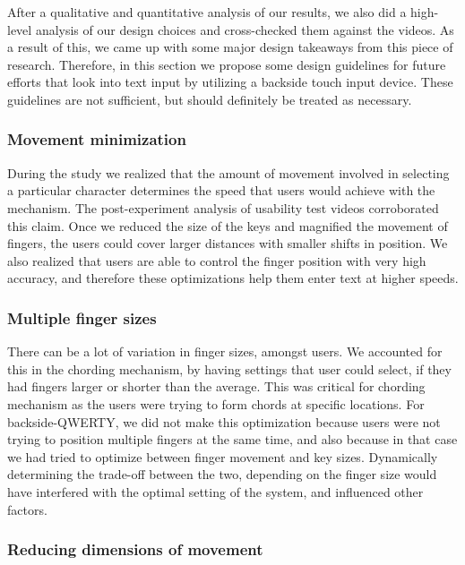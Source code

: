After a qualitative and quantitative analysis of our results, we also
did a high-level analysis of our design choices and cross-checked them
against the videos. As a result of this, we came up with some major
design takeaways from this piece of research. Therefore, in this
section we propose some design guidelines for future efforts that look
into text input by utilizing a backside touch input device. These
guidelines are not sufficient, but should definitely be treated as
necessary.

\subsubsection{Movement minimization}

During the study we realized that the amount of movement involved in
selecting a particular character determines the speed that users would
achieve with the mechanism. The post-experiment analysis of usability
test videos corroborated this claim. Once we reduced the size of the
keys and magnified the movement of fingers, the users could cover
larger distances with smaller shifts in position. We also realized
that users are able to control the finger position with very high
accuracy, and therefore these optimizations help them enter text at
higher speeds.

\subsubsection{Multiple finger sizes}

There can be a lot of variation in finger sizes, amongst users. We
accounted for this in the chording mechanism, by having settings that
user could select, if they had fingers larger or shorter than the
average. This was critical for chording mechanism as the users were
trying to form chords at specific locations. For backside-QWERTY, we
did not make this optimization because users were not trying to
position multiple fingers at the same time, and also because in that
case we had tried to optimize between finger movement and key
sizes. Dynamically determining the trade-off between the two,
depending on the finger size would have interfered with the optimal
setting of the system, and influenced other factors.

\subsubsection{Reducing dimensions of movement}

